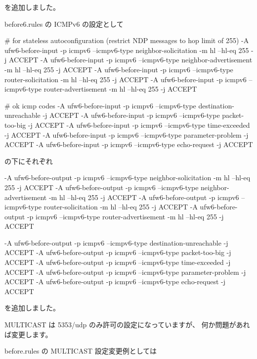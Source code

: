 \documentclass[mingoth,a4paper]{jsarticle}
\begin{document}
を追加しました。

before6.rules の ICMPv6 の設定として

\begin{commandline}
# for stateless autoconfiguration (restrict NDP messages to hop limit of 255)
-A ufw6-before-input -p icmpv6 --icmpv6-type neighbor-solicitation -m hl --hl-eq 255 -j ACCEPT
-A ufw6-before-input -p icmpv6 --icmpv6-type neighbor-advertisement -m hl --hl-eq 255 -j ACCEPT
-A ufw6-before-input -p icmpv6 --icmpv6-type router-solicitation -m hl --hl-eq 255 -j ACCEPT
-A ufw6-before-input -p icmpv6 --icmpv6-type router-advertisement -m hl --hl-eq 255 -j ACCEPT
\end{commandline}

\begin{commandline}
# ok icmp codes
-A ufw6-before-input -p icmpv6 --icmpv6-type destination-unreachable -j ACCEPT
-A ufw6-before-input -p icmpv6 --icmpv6-type packet-too-big -j ACCEPT
-A ufw6-before-input -p icmpv6 --icmpv6-type time-exceeded -j ACCEPT
-A ufw6-before-input -p icmpv6 --icmpv6-type parameter-problem -j ACCEPT
-A ufw6-before-input -p icmpv6 --icmpv6-type echo-request -j ACCEPT
\end{commandline}

の下にそれぞれ

\begin{commandline}
-A ufw6-before-output -p icmpv6 --icmpv6-type neighbor-solicitation -m hl --hl-eq 255 -j ACCEPT
-A ufw6-before-output -p icmpv6 --icmpv6-type neighbor-advertisement -m hl --hl-eq 255 -j ACCEPT
-A ufw6-before-output -p icmpv6 --icmpv6-type router-solicitation -m hl --hl-eq 255 -j ACCEPT
-A ufw6-before-output -p icmpv6 --icmpv6-type router-advertisement -m hl --hl-eq 255 -j ACCEPT
\end{commandline}

\begin{commandline}
-A ufw6-before-output -p icmpv6 --icmpv6-type destination-unreachable -j ACCEPT
-A ufw6-before-output -p icmpv6 --icmpv6-type packet-too-big -j ACCEPT
-A ufw6-before-output -p icmpv6 --icmpv6-type time-exceeded -j ACCEPT
-A ufw6-before-output -p icmpv6 --icmpv6-type parameter-problem -j ACCEPT
-A ufw6-before-output -p icmpv6 --icmpv6-type echo-request -j ACCEPT
\end{commandline}

を追加しました。


MULTICAST は 5353/udp のみ許可の設定になっていますが、
何か問題があれば変更します。

before.rules の MULTICAST 設定変更例としては
\end{document}
